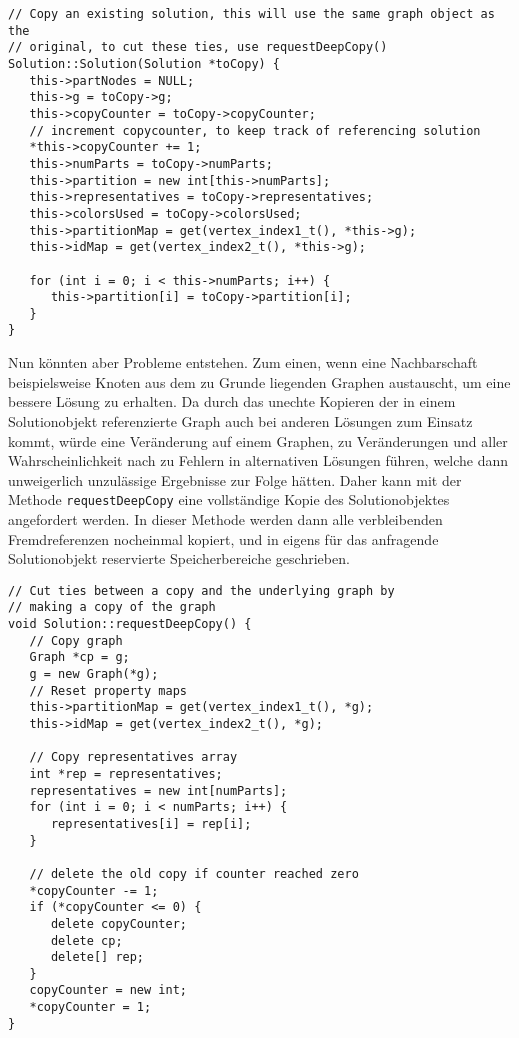 \singlespacing
\begin{lstlisting}[caption={Der Kopierkonstruktor der Solutionklasse},label={lst:copy}]
// Copy an existing solution, this will use the same graph object as the 
// original, to cut these ties, use requestDeepCopy()
Solution::Solution(Solution *toCopy) {
   this->partNodes = NULL;
   this->g = toCopy->g;
   this->copyCounter = toCopy->copyCounter;
   // increment copycounter, to keep track of referencing solution
   *this->copyCounter += 1;
   this->numParts = toCopy->numParts;
   this->partition = new int[this->numParts];
   this->representatives = toCopy->representatives;
   this->colorsUsed = toCopy->colorsUsed;
   this->partitionMap = get(vertex_index1_t(), *this->g);
   this->idMap = get(vertex_index2_t(), *this->g);
   
   for (int i = 0; i < this->numParts; i++) {
      this->partition[i] = toCopy->partition[i];
   }
}
\end{lstlisting}

Nun könnten aber Probleme entstehen. Zum einen, wenn eine Nachbarschaft beispielsweise Knoten aus dem zu Grunde liegenden Graphen austauscht, um eine bessere Lösung zu erhalten. Da durch das unechte Kopieren
der in einem Solutionobjekt referenzierte Graph auch bei anderen Lösungen zum Einsatz kommt, würde eine Veränderung auf einem Graphen, zu Veränderungen und aller Wahrscheinlichkeit nach zu Fehlern in alternativen
Lösungen führen, welche dann unweigerlich unzulässige Ergebnisse zur Folge hätten. Daher kann mit der Methode \texttt{requestDeepCopy} eine vollständige Kopie des Solutionobjektes angefordert werden. In dieser
Methode werden dann alle verbleibenden Fremdreferenzen nocheinmal kopiert, und in eigens für das anfragende Solutionobjekt reservierte Speicherbereiche geschrieben.

\singlespacing
\begin{lstlisting}[caption={Die Methode \texttt{requestDeepCopy} of the Solution class},label={lst:deepcopy}]
// Cut ties between a copy and the underlying graph by 
// making a copy of the graph
void Solution::requestDeepCopy() {
   // Copy graph
   Graph *cp = g;
   g = new Graph(*g);
   // Reset property maps
   this->partitionMap = get(vertex_index1_t(), *g);
   this->idMap = get(vertex_index2_t(), *g);

   // Copy representatives array
   int *rep = representatives;
   representatives = new int[numParts];
   for (int i = 0; i < numParts; i++) {
      representatives[i] = rep[i];
   }

   // delete the old copy if counter reached zero
   *copyCounter -= 1;
   if (*copyCounter <= 0) {
      delete copyCounter;
      delete cp;
      delete[] rep;
   }
   copyCounter = new int;
   *copyCounter = 1;
}
\end{lstlisting}


